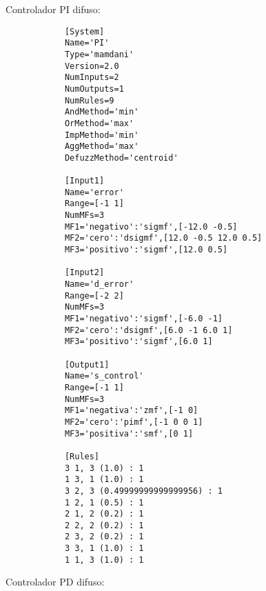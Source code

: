    Controlador PI difuso:

    \begin{longlisting}				
        \begin{verbatim}
            [System]
            Name='PI'
            Type='mamdani'
            Version=2.0
            NumInputs=2
            NumOutputs=1
            NumRules=9
            AndMethod='min'
            OrMethod='max'
            ImpMethod='min'
            AggMethod='max'
            DefuzzMethod='centroid'

            [Input1]
            Name='error'
            Range=[-1 1]
            NumMFs=3
            MF1='negativo':'sigmf',[-12.0 -0.5]
            MF2='cero':'dsigmf',[12.0 -0.5 12.0 0.5]
            MF3='positivo':'sigmf',[12.0 0.5]

            [Input2]
            Name='d_error'
            Range=[-2 2]
            NumMFs=3
            MF1='negativo':'sigmf',[-6.0 -1]
            MF2='cero':'dsigmf',[6.0 -1 6.0 1]
            MF3='positivo':'sigmf',[6.0 1]

            [Output1]
            Name='s_control'
            Range=[-1 1]
            NumMFs=3
            MF1='negativa':'zmf',[-1 0]
            MF2='cero':'pimf',[-1 0 0 1]
            MF3='positiva':'smf',[0 1]

            [Rules]
            3 1, 3 (1.0) : 1
            1 3, 1 (1.0) : 1
            3 2, 3 (0.49999999999999956) : 1
            1 2, 1 (0.5) : 1
            2 1, 2 (0.2) : 1
            2 2, 2 (0.2) : 1
            2 3, 2 (0.2) : 1
            3 3, 1 (1.0) : 1
            1 1, 3 (1.0) : 1
        \end{verbatim}
    \end{longlisting}

    Controlador PD difuso:

